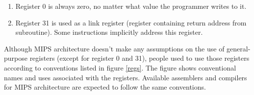 \documentclass[]{scrartcl}
\begin{document}
\begin{enumerate}

\item Register 0 is always zero, no matter what value the programmer
      writes to it.

\item Register 31 is used as a link register (register containing
      return address from subroutine). Some instructions implicitly
      address this register.

\end{enumerate}

Although MIPS architecture doesn't make any assumptions on the use
of general-purpose registers (except for register 0 and 31), people
used to use those registers according to conventions listed in
figure \ref{regs}. The figure shows conventional names and uses
associated with the registers. Available assemblers and compilers
for MIPS architecture are expected to follow the same conventions.
\end{document}
